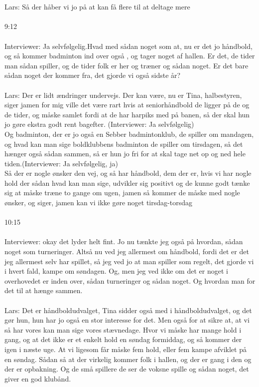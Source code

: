 \\\\
Lars: Så der håber vi jo på at kan få flere til at deltage mere 
\\\\
9:12 
\\\\
Interviewer: Ja selvfølgelig.Hvad med sådan noget som at, nu er det jo håndbold, og så kommer badminton ind over også , og tager noget af hallen. Er det, de tider man sådan spiller, og de tider folk er her og træner og sådan noget. Er det bare sådan noget der kommer fra, det gjorde vi også sidste år? 
\\\\
Lars: Der er lidt ændringer undervejs. Der kan være, nu er Tina, halbestyren, siger jamen for mig ville det være rart hvis at seniorhåndbold de ligger på de og de tider, og måske samlet fordi at de har harpiks med på banen, så der skal hun jo gøre ekstra godt rent bagefter. (Interviewer: Ja selvfølgelig)\\
Og badminton, der er jo også en Sebber badmintonklub, de spiller om mandagen, og hvad kan man sige boldklubbens badminton de spiller om tirsdagen, så det hænger også sådan sammen, så er hun jo fri for at skal tage net op og ned hele tiden.(Interviewer: Ja selvfølgelig, ja)\\
Så der er nogle ønsker den vej, og så har håndbold, dem der er, hvis vi har nogle hold der sådan hvad kan man sige, udvikler sig positivt og de kunne godt tænke sig at måske træne to gange om ugen, jamen så kommer de måske med nogle ønsker,  og siger, jamen kan vi ikke gøre noget tirsdag-torsdag
\\\\
10:15
\\\\
Interviewer: okay det lyder helt fint. Jo nu tænkte jeg også på hvordan, sådan noget som turneringer. Altså nu ved jeg allermest om håndbold, fordi det er det jeg allermest selv har spillet, så jeg ved jo at man spiller som regelt, det gjorde vi i hvert fald, kampe om søndagen. Og, men jeg ved ikke om det er noget i overhovedet er inden over, sådan turneringer og sådan noget. Og hvordan man for det til at hænge sammen. 
\\\\
Lars:  Det er håndboldudvalget, Tina sidder også med i håndboldudvalget, og det gør hun, hun har jo også en stor interesse for det. Men også for at sikre at, at vi så har vores kan man sige vores stævnedage. Hvor vi måske har mange hold i gang, og at det ikke er et enkelt hold en søndag formiddag, og så kommer der igen i næste uge. At vi ligesom får måske fem hold, eller fem kampe afviklet på en søndag. Sådan så at der virkelig kommer folk i hallen, og der er gang i den og der er opbakning. Og de små spillere de ser de voksne spille og sådan noget, det giver en god klubånd.

